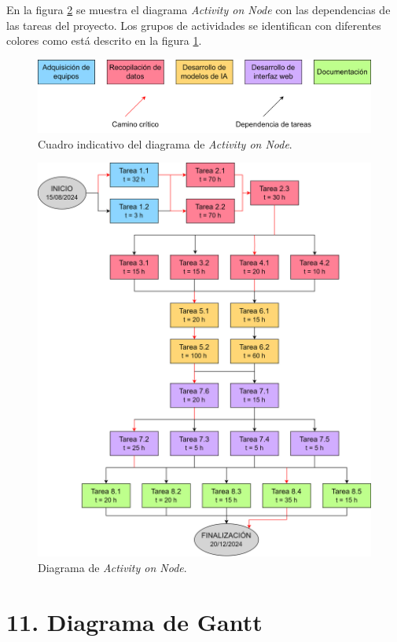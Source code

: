 \documentclass[
11pt, %
]{charter}
\begin{document}
En la figura \ref{fig:AoN} se muestra el diagrama \textit{Activity on Node} con las dependencias de las tareas del proyecto. Los grupos de actividades se identifican con diferentes colores como está descrito en la figura \ref{fig:LegendAoN}.

\begin{figure}[htpb]
\centering 
\includegraphics[width=.8\textwidth]{./Figuras/Legend Activity on Node.png}
\caption{Cuadro indicativo del diagrama de \textit{Activity on Node}.}
\label{fig:LegendAoN}
\end{figure}

\begin{figure}[htpb]
\centering 
\includegraphics[width=.8\textwidth]{./Figuras/Activity on Node.png}
\caption{Diagrama de \textit{Activity on Node}.}
\label{fig:AoN}
\end{figure}

\section{11. Diagrama de Gantt}
\label{sec:gantt}
\end{document}
